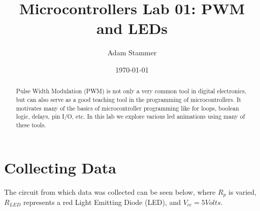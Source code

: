 \documentclass[prb,preprint]{revtex4-1}
\begin{document}
\title{Microcontrollers Lab 01: PWM and LEDs}
\author{Adam Stammer}

\date{\today}

\begin{abstract}
Pulse Width Modulation (PWM) is not only a very common tool in digital electronics, but can also serve as a good teaching tool in the programming of microcontrollers. It motivates many of the basics of microcontroller programming like for loops, boolean logic, delays, pin I/O, etc. In this lab we explore various led animations using many of these tools.
\end{abstract}

\maketitle


%
%
%
%
%
%
%
%

\section{Collecting Data}
The circuit from which data was collected can be seen below, where $R_{p}$ is varied, $R_{LED}$ represents a red Light Emitting Diode (LED), and $V_{cc}=5 Volts$. 
\end{document}
